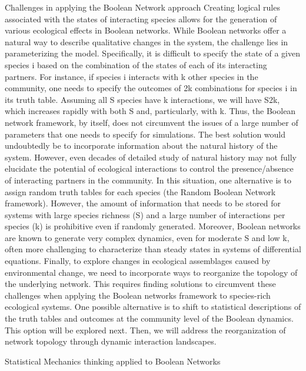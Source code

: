 Challenges in applying the Boolean Network approach
Creating logical rules associated with the states of interacting species allows for the generation of various ecological effects in Boolean networks. While Boolean networks offer a natural way to describe qualitative changes in the system, the challenge lies in parameterizing the model. Specifically, it is difficult to specify the state of a given species i based on the combination of the states of each of its interacting partners. For instance, if species i interacts with k other species in the community, one needs to specify the outcomes of 2k combinations for species i in its truth table. Assuming all S species have k interactions, we will have S2k, which increases rapidly with both S and, particularly, with k. Thus, the Boolean network framework, by itself, does not circumvent the issues of a large number of parameters that one needs to specify for simulations. 
The best solution would undoubtedly be to incorporate information about the natural history of the system. However, even decades of detailed study of natural history may not fully elucidate the potential of ecological interactions to control the presence/absence of interacting partners in the community. In this situation, one alternative is to assign random truth tables for each species (the Random Boolean Network framework). However, the amount of information that needs to be stored for systems with large species richness (S) and a large number of interactions per species (k) is prohibitive even if randomly generated. Moreover, Boolean networks are known to generate very complex dynamics, even for moderate S and low k, often more challenging to characterize than steady states in systems of differential equations. Finally, to explore changes in ecological assemblages caused by environmental change, we need to incorporate ways to reorganize the topology of the underlying network. This requires finding solutions to circumvent these challenges when applying the Boolean networks framework to species-rich ecological systems. One possible alternative is to shift to statistical descriptions of the truth tables and outcomes at the community level of the Boolean dynamics. This option will be explored next. Then, we will address the reorganization of network topology through dynamic interaction landscapes.

Statistical Mechanics thinking applied to Boolean Networks
	
